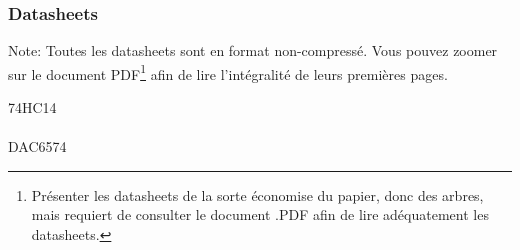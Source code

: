 \documentclass[10pt,a4paper,final]{article}
\begin{document}
\begin{spacing}{1.5}
\subsubsection{Datasheets}
Note: Toutes les datasheets sont en format non-compressé. Vous pouvez zoomer sur le document PDF\footnote{Présenter les datasheets de la sorte économise du papier, donc des arbres, mais requiert de consulter le document .PDF afin de lire adéquatement les datasheets.} afin de lire l'intégralité de leurs premières pages.
\begin{multicols}{3}
74HC14\\
\\
DAC6574\\

\end{multicols}
\end{spacing}
\end{document}
